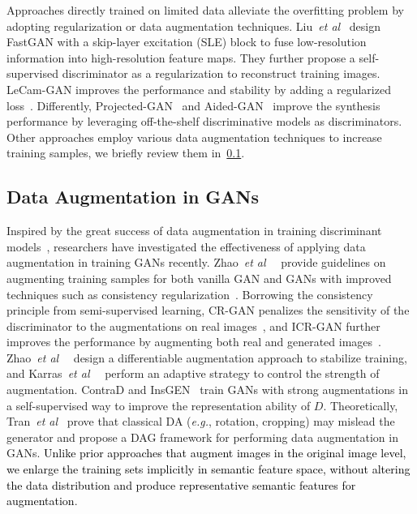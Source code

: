 \documentclass[10pt,journal,compsoc]{IEEEtran}
\newcommand{\etal}{\textit{et al}}
\newcommand{\revise}[1]{\textcolor{black}{#1}}
\begin{document}
Approaches directly trained on limited data alleviate the overfitting problem by adopting regularization or data augmentation techniques.
Liu~\etal~\cite{liu2021towards} design FastGAN with a skip-layer excitation (SLE) block to fuse low-resolution information into high-resolution feature maps. They further propose a self-supervised discriminator as a regularization to reconstruct training images.
LeCam-GAN improves the performance and stability by adding a regularized loss~\cite{tseng2021regularizing}.
Differently, Projected-GAN~\cite{projectedGAN} and Aided-GAN~\cite{kumari2022ensembling} improve the synthesis performance by leveraging off-the-shelf discriminative models as discriminators.
%
Other approaches employ various data augmentation techniques to increase training samples, we briefly review them in~\ref{Sec:RelatedDA}.

\subsection{Data Augmentation in GANs}
\label{Sec:RelatedDA}
Inspired by the great success of data augmentation in training discriminant models~\cite{zhang2018mixup, shorten2019survey}, researchers have investigated the effectiveness of applying data augmentation in training GANs recently.
Zhao~\etal~~\cite{zhao2020image} provide guidelines on augmenting training samples for both vanilla GAN and GANs with improved techniques such as consistency regularization~\cite{CR2020}.
Borrowing the consistency principle from semi-supervised learning, CR-GAN penalizes the sensitivity of the discriminator to the augmentations on real images~\cite{CR2020}, and ICR-GAN further improves the performance by augmenting both real and generated images~\cite{zhao2020improved}.
Zhao~\etal~~\cite{DiffAug} design a differentiable augmentation approach to stabilize training, and Karras~\etal~~\cite{karras2020training} perform an adaptive strategy to control the strength of augmentation.
ContraD\cite{jeong2021training} and InsGEN~\cite{yang2021insgen} train GANs with strong augmentations in a self-supervised way to improve the representation ability of $D$.
Theoretically, Tran~\etal~\cite{tran2021on} prove that classical DA (\emph{e.g.}, rotation, cropping) may mislead the generator and propose a DAG framework for performing data augmentation in GANs.
\revise{Unlike prior approaches that augment images in the original image level, we enlarge the training sets implicitly in semantic feature space, without altering the data distribution and produce representative semantic features for augmentation}.
\end{document}

